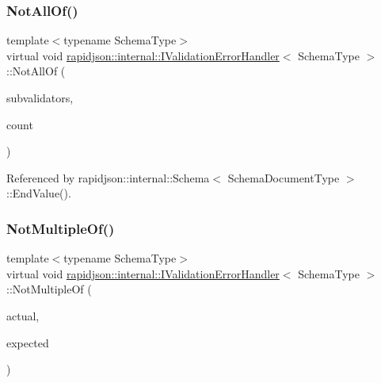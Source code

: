 \subsubsection{\texorpdfstring{NotAllOf()}{NotAllOf()}}
{\footnotesize\ttfamily template$<$typename Schema\+Type$>$ \\
virtual void \mbox{\hyperlink{classrapidjson_1_1internal_1_1_i_validation_error_handler}{rapidjson\+::internal\+::\+I\+Validation\+Error\+Handler}}$<$ Schema\+Type $>$\+::Not\+All\+Of (\begin{DoxyParamCaption}\item[{\mbox{\hyperlink{classrapidjson_1_1internal_1_1_i_schema_validator}{I\+Schema\+Validator}} $\ast$$\ast$}]{subvalidators,  }\item[{\mbox{\hyperlink{namespacerapidjson_a44eb33eaa523e36d466b1ced64b85c84}{Size\+Type}}}]{count }\end{DoxyParamCaption})\hspace{0.3cm}{\ttfamily [pure virtual]}}



Referenced by rapidjson\+::internal\+::\+Schema$<$ Schema\+Document\+Type $>$\+::\+End\+Value().

\mbox{\label{classrapidjson_1_1internal_1_1_i_validation_error_handler_a2dcb25e9e8550903cac1c9dd8286b7a3}} 
\subsubsection{\texorpdfstring{NotMultipleOf()}{NotMultipleOf()}\hspace{0.1cm}{\footnotesize\ttfamily [1/3]}}
{\footnotesize\ttfamily template$<$typename Schema\+Type$>$ \\
virtual void \mbox{\hyperlink{classrapidjson_1_1internal_1_1_i_validation_error_handler}{rapidjson\+::internal\+::\+I\+Validation\+Error\+Handler}}$<$ Schema\+Type $>$\+::Not\+Multiple\+Of (\begin{DoxyParamCaption}\item[{\mbox{\hyperlink{stdint_8h_a414156feea104f8f75b4ed9e3121b2f6}{int64\+\_\+t}}}]{actual,  }\item[{const \mbox{\hyperlink{classrapidjson_1_1internal_1_1_i_validation_error_handler_a8a2aaf7eb28a3ce7ed81689141f3af1f}{S\+Value}} \&}]{expected }\end{DoxyParamCaption})\hspace{0.3cm}{\ttfamily [pure virtual]}}




